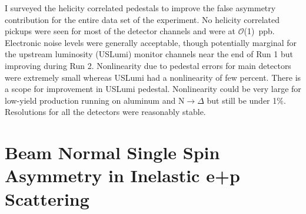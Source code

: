 
I surveyed the helicity correlated pedestals to improve the false asymmetry contribution for the entire data set of the experiment. 
No helicity correlated pickups were seen for most of the detector channels and were at $\mathcal{O}$(1)~ppb. Electronic noise levels were generally acceptable, though potentially marginal for the upstream luminosity (USLumi) monitor channels near the end of Run 1 but improving during Run 2. Nonlinearity due to pedestal errors for main detectors were extremely small whereas USLumi had a nonlinearity of few percent. There is a scope for improvement in USLumi pedestal. Nonlinearity could be very large for low-yield production running on aluminum and N$\rightarrow\Delta$ but still be under 1\%. Resolutions for all the detectors were reasonably stable. 


\section{Beam Normal Single Spin Asymmetry in Inelastic e+p Scattering}

